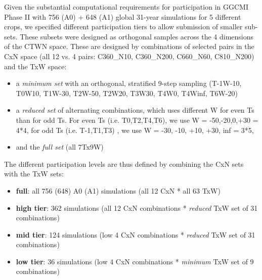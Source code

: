 \documentclass[gmd, manuscript]{copernicus} %
\begin{document}
Given the substantial computational requirements for participation in GGCMI Phase II with 756 (A0) + 648 (A1) global 31-year simulations for 5 different crops, we specified different participation tiers to allow submission of smaller sub-sets. 
These subsets were designed as orthogonal samples across the 4 dimensions of the CTWN space. 
These are designed by combinations of selected pairs in the CxN space (all 12 vs. 4 pairs: C360\_N10, C360\_N200, C660\_N60, C810\_N200) and the TxW space:
\begin{itemize}
\item a \textit{minimum set} with an orthogonal, stratified 9-step sampling (T-1W-10, T0W10, T1W-30, T2W-50, T2W20, T3W30, T4W0, T4Winf, T6W-20)
\item a \textit{reduced set} of alternating combinations, which uses different W for even Ts than for odd Ts. For even Ts (i.e. T0,T2,T4,T6), we use W = -50,-20,0,+30 = 4*4, for odd Ts (i.e. T-1,T1,T3) , we use W = -30, -10, +10, +30, inf = 3*5,
\item and the \textit{full set} (all 7Tx9W)
\end{itemize}

The different participation levels are thus defined by combining the CxN sets with the TxW sets:

\begin{itemize}
\item \textbf{full}: all 756 (648) A0 (A1) simulations (all 12 CxN * all 63 TxW)
\item \textbf{high tier}: 362 simulations (all 12 CxN combinations * \textit{reduced} TxW set of 31 combinations)
\item \textbf{mid tier}: 124 simulations (low 4 CxN combinations * \textit{reduced} TxW set of 31 combinations)
\item \textbf{low tier}: 36 simulations (low 4 CxN combinations * \textit{minimum} TxW set of 9 combinations)
\end{itemize}
\end{document}
